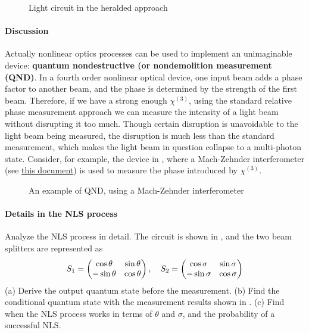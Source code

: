 \documentclass[hyperref, a4paper]{article}
\newcommand*{\concept}[1]{{\textbf{#1}}}
\begin{document}
\begin{figure}
    \centering
    
    \caption{Light circuit in the heralded approach}
    \label{fig:heralded-circuit}
\end{figure}

\paragraph{Discussion} Actually nonlinear optics processes can be used to implement an unimaginable device: \concept{quantum nondestructive (or nondemolition measurement (QND)}.
In a fourth order nonlinear optical device, one input beam adds a phase factor to another beam, 
and the phase is determined by the strength of the first beam.
Therefore, if we have a strong enough $\chi^{(3)}$, using the standard relative phase measurement approach we can measure the 
intensity of a light beam without disrupting it too much. 
Though certain disruption is unavoidable to the light beam being measured, the disruption is much less than the standard measurement,
which makes the light beam in question collapse to a multi-photon state.
Consider, for example, the device in , where a Mach-Zehnder interferometer (see \href{../quantum-optics/10-21}{this document}) is used to measure the phase introduced by $\chi^{(3)}$. 

\begin{figure}
    \centering
    
    \caption{An example of QND, using a Mach-Zehnder interferometer}
    \label{fig:gnd}
\end{figure}

\paragraph{}

\paragraph{Details in the NLS process} Analyze the NLS process in detail. 
The circuit is shown in , and the two beam splitters are represented as 
\begin{equation}
    S_1 = \pmqty{\cos \theta & \sin \theta \\
    - \sin \theta & \cos \theta}, \quad S_2 = \pmqty{\cos \sigma & \sin \sigma \\
    - \sin \sigma & \cos \sigma}
\end{equation}
(a) Derive the output quantum state before the measurement.
(b) Find the conditional quantum state with the measurement results shown in .
(c) Find when the NLS process works in terms of $\theta$ and $\sigma$, and the probability of a successful NLS.
\end{document}
